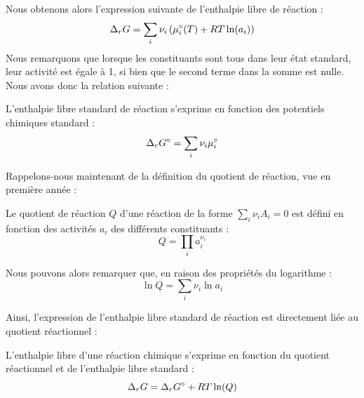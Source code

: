 \documentclass[11pt,fleqn]{book} %
\begin{document}
Nous obtenons alors l'expression suivante de l'enthalpie libre de réaction :
\begin{equation}
    \Delta_r G = \sum_i \nu_i\left(\mu_i\degree(T) + RT \ln(a_i)\right)
\end{equation}
Nous remarquons que lorsque les constituants sont tous dans leur état standard, leur activité est égale à 1, si bien que le second terme dans la somme est nulle. Nous avons donc la relation suivante :
\begin{proposition}
    L'enthalpie libre standard de réaction s'exprime en fonction des potentiels chimiques standard :
    \begin{equation}
        \Delta_r G\degree = \sum_i \nu_i \mu_i\degree
    \end{equation}
\end{proposition}

Rappelons-nous maintenant de la définition du quotient de réaction, vue en première année :
\begin{definition}
    Le quotient de réaction $Q$ d'une réaction de la forme $\sum_i \nu_i A_i =0$ est défini en fonction des activités $a_i$ des différents constituants :
    \begin{equation}
        Q = \prod_i a_i^{\nu_i}
    \end{equation}
\end{definition}
Nous pouvons alors remarquer que, en raison des propriétés du logarithme :
\begin{equation}
    \ln Q = \sum_i \nu_i \ln a_i
\end{equation}

Ainsi, l'expression de l'enthalpie libre standard de réaction est directement liée au quotient réactionnel :
\begin{proposition}
    L'enthalpie libre d'une réaction chimique s'exprime en fonction du quotient réactionnel et de l'enthalpie libre standard :
    \begin{equation}
        \Delta_r G = \Delta_r G\degree + RT \ln(Q)
    \end{equation}
\end{proposition}
\end{document}
